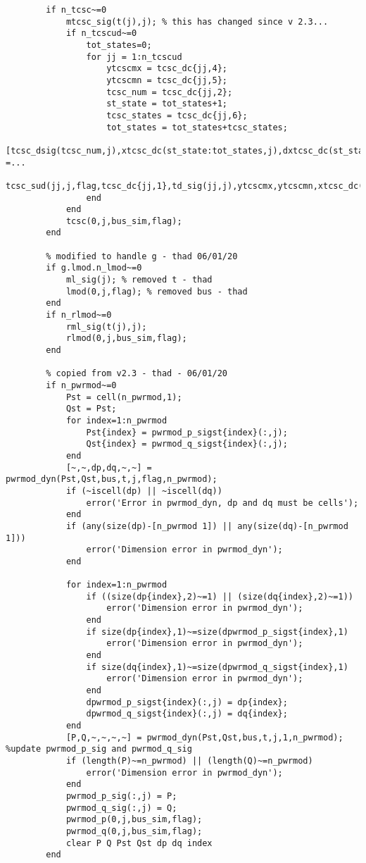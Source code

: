 \documentclass[12pt]{article}
\begin{document}
\begin{verbatim}
        if n_tcsc~=0
            mtcsc_sig(t(j),j); % this has changed since v 2.3...
            if n_tcscud~=0
                tot_states=0;
                for jj = 1:n_tcscud
                    ytcscmx = tcsc_dc{jj,4};
                    ytcscmn = tcsc_dc{jj,5};
                    tcsc_num = tcsc_dc{jj,2};
                    st_state = tot_states+1; 
                    tcsc_states = tcsc_dc{jj,6}; 
                    tot_states = tot_states+tcsc_states;
                    [tcsc_dsig(tcsc_num,j),xtcsc_dc(st_state:tot_states,j),dxtcsc_dc(st_state:tot_states,j)] =...
                        tcsc_sud(jj,j,flag,tcsc_dc{jj,1},td_sig(jj,j),ytcscmx,ytcscmn,xtcsc_dc(st_state:tot_states,j));
                end
            end
            tcsc(0,j,bus_sim,flag);
        end
        
        % modified to handle g - thad 06/01/20
        if g.lmod.n_lmod~=0
            ml_sig(j); % removed t - thad
            lmod(0,j,flag); % removed bus - thad
        end
        if n_rlmod~=0
            rml_sig(t(j),j);
            rlmod(0,j,bus_sim,flag);
        end
        
        % copied from v2.3 - thad - 06/01/20
        if n_pwrmod~=0
            Pst = cell(n_pwrmod,1);
            Qst = Pst;
            for index=1:n_pwrmod
                Pst{index} = pwrmod_p_sigst{index}(:,j);
                Qst{index} = pwrmod_q_sigst{index}(:,j);
            end
            [~,~,dp,dq,~,~] = pwrmod_dyn(Pst,Qst,bus,t,j,flag,n_pwrmod);
            if (~iscell(dp) || ~iscell(dq))
                error('Error in pwrmod_dyn, dp and dq must be cells'); 
            end
            if (any(size(dp)-[n_pwrmod 1]) || any(size(dq)-[n_pwrmod 1]))
                error('Dimension error in pwrmod_dyn'); 
            end
            
            for index=1:n_pwrmod
                if ((size(dp{index},2)~=1) || (size(dq{index},2)~=1))
                    error('Dimension error in pwrmod_dyn'); 
                end
                if size(dp{index},1)~=size(dpwrmod_p_sigst{index},1)
                    error('Dimension error in pwrmod_dyn'); 
                end
                if size(dq{index},1)~=size(dpwrmod_q_sigst{index},1)
                    error('Dimension error in pwrmod_dyn'); 
                end
                dpwrmod_p_sigst{index}(:,j) = dp{index};
                dpwrmod_q_sigst{index}(:,j) = dq{index};
            end
            [P,Q,~,~,~,~] = pwrmod_dyn(Pst,Qst,bus,t,j,1,n_pwrmod); %update pwrmod_p_sig and pwrmod_q_sig
            if (length(P)~=n_pwrmod) || (length(Q)~=n_pwrmod)
                error('Dimension error in pwrmod_dyn');
            end
            pwrmod_p_sig(:,j) = P;
            pwrmod_q_sig(:,j) = Q;
            pwrmod_p(0,j,bus_sim,flag);
            pwrmod_q(0,j,bus_sim,flag);
            clear P Q Pst Qst dp dq index
        end
        

\end{verbatim}
\end{document}
